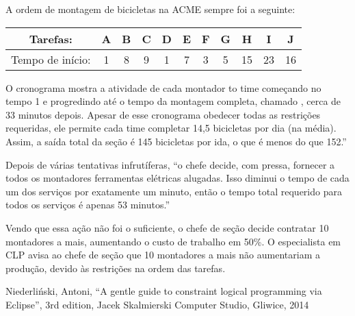 \documentclass{article}
\begin{document}
A ordem de montagem de bicicletas na ACME sempre foi a seguinte:

\begin{tabular}{c c c c c c c c c c c}
Tarefas: & A & B & C & D & E & F & G & H & I & J \\
\hline
Tempo de início:   & 1 & 8 & 9 & 1 & 7 & 3 & 5 & 15 & 23 & 16  \\
\end{tabular}



O cronograma mostra a atividade de cada montador to time começando no tempo 1 e progredindo até o
tempo da montagem completa, chamado , cerca de 33 minutos depois.
Apesar de esse cronograma obedecer todas as restrições requeridas, ele permite cada time completar
14,5 bicicletas por dia (na média). Assim, a saída total da seção é 145 bicicletas por ida, o que é
menos do que 152.''

%
Depois de várias tentativas infrutíferas, ``o chefe decide, com pressa, fornecer a todos os
montadores ferramentas elétricas alugadas. Isso diminui o tempo de cada um dos serviços por
exatamente um minuto, então o tempo total requerido para todos os serviços é apenas 53 minutos.''


Vendo que essa ação não foi o suficiente, o chefe de seção decide contratar 10 montadores a mais,
aumentando o custo de trabalho em 50\%. O especialista em CLP avisa ao chefe de seção que 10
montadores a mais não aumentariam a produção, devido às restrições na ordem das tarefas.




  \begin{thebibliography}{2}

    Niederliński, Antoni,
    ``A gentle guide to constraint logical programming via Eclipse'',
    3rd edition, Jacek Skalmierski Computer Studio, Gliwice, 2014



  \end{thebibliography}
\end{document}
